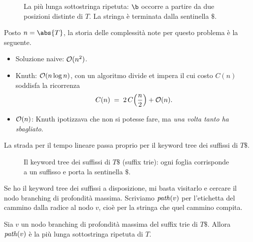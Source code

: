 \begin{figure}[H]
\centering

\caption{La più lunga sottostringa ripetuta: $\b$ occorre a partire da due posizioni
distinte di $T$. La stringa è terminata dalla sentinella $\$$.}
\label{fig:sottostringa-ripetuta}
\end{figure}

Posto $n = \abs{T}$, la storia delle complessità note per questo problema è la seguente.
\begin{itemize}
  \item Soluzione naive: $\mathcal{O}(n^{2})$.
  \item Knuth: $\mathcal{O}(n \log n)$, con un algoritmo divide et impera il cui costo $C(n)$
        soddisfa la ricorrenza
        \[
          C(n) \;=\; 2\,C\!\left(\frac{n}{2}\right) + \mathcal{O}(n).
        \]
  \item $\mathcal{O}(n)$: Knuth ipotizzava che non si potesse fare, ma \emph{una volta tanto ha
        sbagliato}.
\end{itemize}

La strada per il tempo lineare passa proprio per il keyword tree dei suffissi di $T\$$.

\begin{figure}[H]
\centering

\caption{Il keyword tree dei suffissi di $T\$$ (suffix trie): ogni foglia corrisponde a un
suffisso e porta la sentinella $\$$.}
\label{fig:kwtree-suffissi}
\end{figure}

Se ho il keyword tree dei suffissi a disposizione, mi basta visitarlo e cercare il nodo
branching di profondità massima. Scriviamo $\mathit{path}(v)$ per l'etichetta del cammino dalla
radice al nodo $v$, cioè per la stringa che quel cammino compita.

\begin{proposizione}\label{prop:ripetuta}
Sia $v$ un nodo branching di profondità massima del suffix trie di $T\$$. Allora
$\mathit{path}(v)$ è la più lunga sottostringa ripetuta di $T$.
\end{proposizione}


